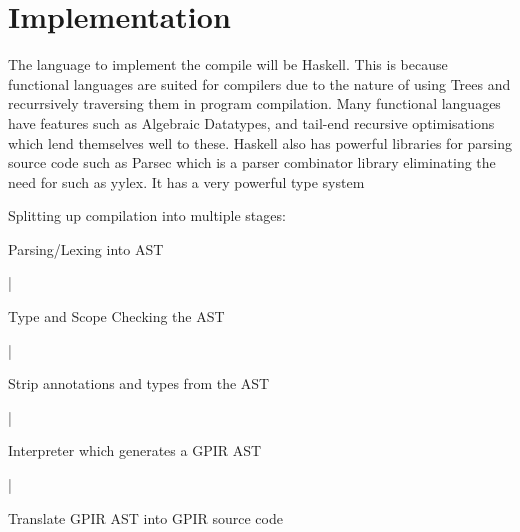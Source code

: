 \chapter{Implementation}

The language to implement the compile will be Haskell.
This is because functional languages are suited for compilers due to the nature of using Trees and recurrsively 
traversing them in program compilation.
Many functional languages have features such as Algebraic Datatypes, and tail-end recursive optimisations
which lend themselves well to these.
Haskell also has powerful libraries for parsing source code such as Parsec which is a parser combinator
library eliminating the need for such as yylex. It has a very powerful type system

Splitting up compilation into multiple stages:
    
    Parsing/Lexing into AST

         |

     Type and Scope Checking the AST

         |

     Strip annotations and types from the AST

        |

     Interpreter which generates a GPIR AST

        |

      Translate GPIR AST into GPIR source code
